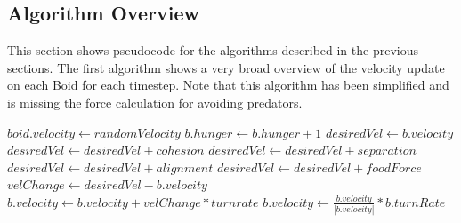 \documentclass{egpubl}
\begin{document}
\subsection{Algorithm Overview}
This section shows pseudocode for the algorithms described in the previous sections. The first algorithm shows a very broad overview of the velocity update on each Boid for each timestep. Note that this algorithm has been simplified and is missing the force calculation for avoiding predators. 
\begin{algorithmic}
    \State $boid.velocity \gets randomVelocity$
\EndFor
{}
        \State $b.hunger \gets b.hunger + 1$
        \State $desiredVel \gets b.velocity$
        \State $desiredVel \gets desiredVel + cohesion$
        \State $desiredVel \gets desiredVel + separation$
        \State $desiredVel \gets desiredVel + alignment$
            \State $desiredVel \gets desiredVel + foodForce$
        \EndIf
        \State $velChange \gets desiredVel - b.velocity$
        \State $b.velocity \gets b.velocity + velChange * turnrate$
        \State $b.velocity \gets \frac{b.velocity}{|b.velocity|} * b.turnRate$
    \EndFor
\EndFor
\EndWhile
\end{algorithmic}
\end{document}
